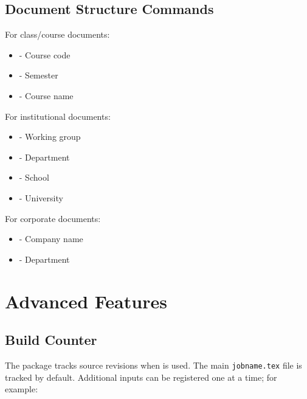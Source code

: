 \documentclass[11pt,letterpaper]{article}
\begin{document}
\subsection{Document Structure Commands}

For class/course documents:
\begin{itemize}
    \item {} - Course code
    \item {} - Semester
    \item {} - Course name
\end{itemize}

For institutional documents:
\begin{itemize}
    \item {} - Working group
    \item {} - Department
    \item {} - School
    \item {} - University
\end{itemize}

For corporate documents:
\begin{itemize}
    \item {} - Company name
    \item {} - Department
\end{itemize}

\section{Advanced Features}

\subsection{Build Counter}

The package tracks source revisions when
 is used. The main
\texttt{jobname.tex} file is tracked by default. Additional inputs can be
registered one at a time; for example:

\begin{center}
\end{center}
\end{document}
